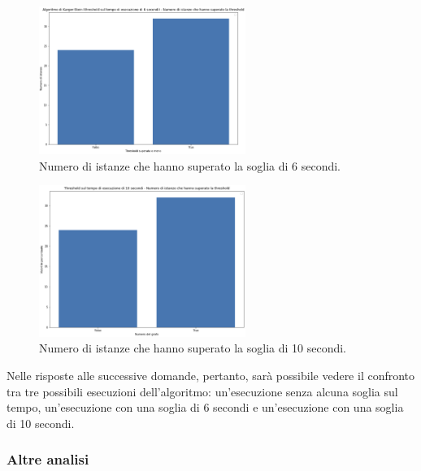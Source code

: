 \begin{figure}[H]
	\centering
	\includegraphics[width=0.6\textwidth]{res/images/single/karger-stein/karger_stein_istanze_superato_threshold_6s.png}
	\caption{Numero di istanze che hanno superato la soglia di 6 secondi.}
	\label{fig:karger_stein_istanze_superato_threshold_6s}
\end{figure}

\begin{figure}[H]
	\centering
	\includegraphics[width=0.6\textwidth]{res/images/single/karger-stein/karger_stein_istanze_superato_threshold_10s.png}
	\caption{Numero di istanze che hanno superato la soglia di 10 secondi.}
	\label{fig:karger_stein_istanze_superato_threshold_10s}
\end{figure}

Nelle risposte alle successive domande, pertanto, sarà possibile vedere il confronto 
tra tre possibili esecuzioni dell'algoritmo: un'esecuzione senza alcuna soglia sul 
tempo, un'esecuzione con una soglia di 6 secondi e un'esecuzione con una soglia di 10 
secondi.

\subsubsection{Altre analisi}

